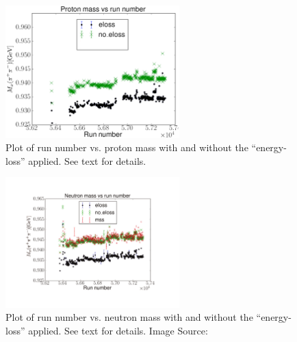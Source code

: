\begin{figure}\begin{center}
\includegraphics[width=0.6\textwidth]{figures/calib/tag/ecor/P_mass_issue.eps}
\caption[Run Number vs. Proton Mass ]{\label{fig:beamcor.p_mass}Plot of  run number vs. proton mass with and without the ``energy-loss'' applied. See text for details.}
\end{center}\end{figure}

\begin{figure}\begin{center}
\includegraphics[width=0.6\textwidth]{figures/calib/tag/ecor/N_mass_issue.pdf}
\caption[Run Number vs. Neutron Mass]{\label{fig:beamcor.n_mass}Plot of  run number vs. neutron mass with and without the ``energy-loss'' applied. See text for details. Image Source:~\cite{clas.thesis.bookwalter}}
\end{center}\end{figure}

